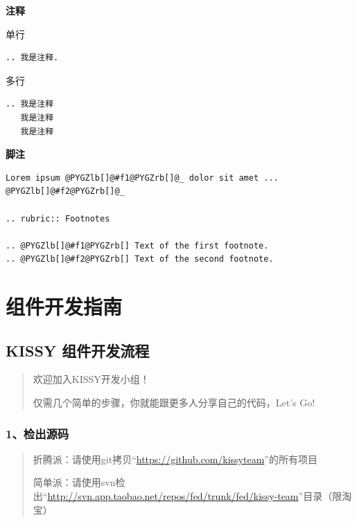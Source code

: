 \documentclass[letterpaper,10pt,english]{sphinxmanual}
\begin{document}
\textbf{注释}

单行

\begin{Verbatim}[commandchars=@\[\]]
.. 我是注释.
\end{Verbatim}

多行

\begin{Verbatim}[commandchars=@\[\]]
.. 我是注释
   我是注释
   我是注释
\end{Verbatim}

\textbf{脚注}

\begin{Verbatim}[commandchars=@\[\]]
Lorem ipsum @PYGZlb[]@#f1@PYGZrb[]@_ dolor sit amet ... @PYGZlb[]@#f2@PYGZrb[]@_

.. rubric:: Footnotes

.. @PYGZlb[]@#f1@PYGZrb[] Text of the first footnote.
.. @PYGZlb[]@#f2@PYGZrb[] Text of the second footnote.
\end{Verbatim}


\chapter{组件开发指南}
\label{workflow/index:id1}\label{workflow/index::doc}\label{workflow/index:workflow}

\section{KISSY 组件开发流程}
\label{workflow/workflow-simple:workflow-simple}\label{workflow/workflow-simple:kissy}\label{workflow/workflow-simple::doc}\begin{quote}

\begin{DUlineblock}{0em}
\item[] 欢迎加入KISSY开发小组！
\item[] 仅需几个简单的步骤，你就能跟更多人分享自己的代码，Let's Go!
\end{DUlineblock}
\end{quote}


\subsection{1、检出源码}
\label{workflow/workflow-simple:id1}\begin{quote}

\begin{DUlineblock}{0em}
\item[] 折腾派：请使用git拷贝“\href{https://github.com/kissyteam}{https://github.com/kissyteam}”的所有项目
\item[] 简单派：请使用svn检出“\href{http://svn.app.taobao.net/repos/fed/trunk/fed/kissy-team}{http://svn.app.taobao.net/repos/fed/trunk/fed/kissy-team}”目录（限淘宝）
\end{DUlineblock}
\end{quote}
\end{document}
